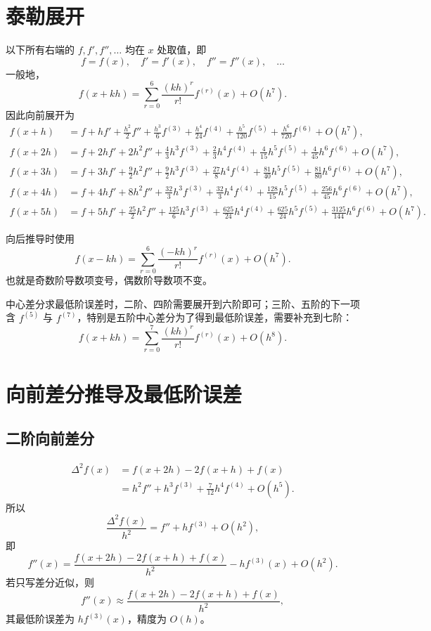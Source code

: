 \documentclass[12pt,a4paper]{ctexart}
\begin{document}
\section{泰勒展开}
以下所有右端的 $f,f',f'',\ldots$ 均在 $x$ 处取值，即
\[
  f=f(x),\quad f'=f'(x),\quad f''=f''(x),\quad \ldots
\]
一般地，
\[
  f(x+kh)=\sum_{r=0}^{6}\frac{(kh)^r}{r!}f^{(r)}(x)+O(h^7).
\]
因此向前展开为
\[
\begin{aligned}
f(x+h)&=f+hf'+\frac{h^2}{2}f''+\frac{h^3}{6}f^{(3)}+\frac{h^4}{24}f^{(4)}+\frac{h^5}{120}f^{(5)}+\frac{h^6}{720}f^{(6)}+O(h^7),\\
f(x+2h)&=f+2hf'+2h^2f''+\frac43h^3f^{(3)}+\frac23h^4f^{(4)}+\frac4{15}h^5f^{(5)}+\frac4{45}h^6f^{(6)}+O(h^7),\\
f(x+3h)&=f+3hf'+\frac92h^2f''+\frac92h^3f^{(3)}+\frac{27}{8}h^4f^{(4)}+\frac{81}{40}h^5f^{(5)}+\frac{81}{80}h^6f^{(6)}+O(h^7),\\
f(x+4h)&=f+4hf'+8h^2f''+\frac{32}{3}h^3f^{(3)}+\frac{32}{3}h^4f^{(4)}+\frac{128}{15}h^5f^{(5)}+\frac{256}{45}h^6f^{(6)}+O(h^7),\\
f(x+5h)&=f+5hf'+\frac{25}{2}h^2f''+\frac{125}{6}h^3f^{(3)}+\frac{625}{24}h^4f^{(4)}+\frac{625}{24}h^5f^{(5)}+\frac{3125}{144}h^6f^{(6)}+O(h^7).
\end{aligned}
\]

向后推导时使用
\[
  f(x-kh)=\sum_{r=0}^{6}\frac{(-kh)^r}{r!}f^{(r)}(x)+O(h^7).
\]
也就是奇数阶导数项变号，偶数阶导数项不变。

中心差分求最低阶误差时，二阶、四阶需要展开到六阶即可；三阶、五阶的下一项含 $f^{(5)}$ 与 $f^{(7)}$，特别是五阶中心差分为了得到最低阶误差，需要补充到七阶：
\[
  f(x+kh)=\sum_{r=0}^{7}\frac{(kh)^r}{r!}f^{(r)}(x)+O(h^8).
\]

\section{向前差分推导及最低阶误差}
\subsection{二阶向前差分}
\[
\begin{aligned}
\Delta^2 f(x)
&=f(x+2h)-2f(x+h)+f(x)\\
&=h^2f''+h^3f^{(3)}+\frac7{12}h^4f^{(4)}+O(h^5).
\end{aligned}
\]
所以
\[
  \frac{\Delta^2 f(x)}{h^2}=f''+h f^{(3)}+O(h^2),
\]
即
\[
  \boxed{f''(x)=\frac{f(x+2h)-2f(x+h)+f(x)}{h^2}-h f^{(3)}(x)+O(h^2).}
\]
若只写差分近似，则
\[
  f''(x)\approx\frac{f(x+2h)-2f(x+h)+f(x)}{h^2},
\]
其最低阶误差为 $h f^{(3)}(x)$，精度为 $O(h)$。
\end{document}
